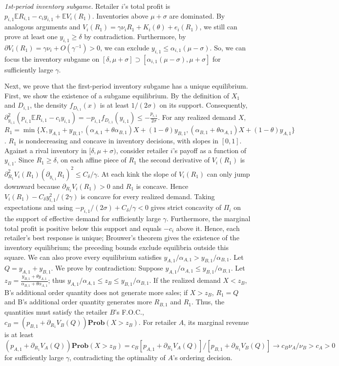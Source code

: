 \documentclass[nonblindrev,copyedit]{informs1}
\begin{document}
\begin{APPENDICES}
\textit{1st-period inventory subgame.}
Retailer $i$'s total profit is $p_{i,1}\mathbb{E} R_{i,1}-c_i y_{i,1}+\mathbb{E} V_i(R_1)$. Inventories above $\mu + \sigma$ are dominated. By analogous arguments and $V_i(R_{1})=\gamma\nu_i R_{1}+K_i(\theta)+e_i(R_{1})$, we still can prove at least one $y_{i,1} \geq \delta$ by contradiction. Furthermore, by $\partial V_i(R_{1}) = \gamma\nu_i + O(\gamma^{-1}) > 0$, we can exclude $y_{i,1}\leq\alpha_{i,1} (\mu - \sigma)$. So, we can focus the inventory subgame on $[\delta, \mu + \sigma] \supset [\alpha_{i,1}(\mu - \sigma), \mu + \sigma]$ for sufficiently large $\gamma$.

Next, we prove that the first-period inventory subgame has a unique equilibrium. First, we show the existence of a subgame equilibrium. By the definition of $X_1$ and $D_{i,1}$, the density $f_{D_{i,1}}(x)$ is at least $1/(2\sigma)$ on its support. Consequently, $\partial^2_{y_{i,1}}( p_{i,1}\mathbb{E} R_{i,1} - c_i y_{i,1} ) = -p_{i,1} f_{D_{i,1}}(y_{i,1}) \leq - \frac{p_{i,1}}{2 \sigma}$. For any realized demand $X$, $R_1=\min\{X,y_{A,1}+y_{B,1},(\alpha_{A,1}+\theta\alpha_{B,1})X+(1-\theta)y_{B,1}, (\alpha_{B,1}+\theta\alpha_{A,1})X+(1-\theta)y_{A,1}\}$. $R_1$ is nondecreasing and concave in inventory decisions, with slopes in $[0,1]$.
Against a rival inventory in $[\delta, \mu + \sigma)$, consider retailer $i$'s payoff as a function of $y_{i,1}$. Since $R_1\ge\delta$, on each affine piece of $R_1$ the second derivative of $V_i(R_1)$ is $\partial^2_{R_1}V_i(R_1)(\partial_{y_{i,1}}R_1)^2\le C_\delta/\gamma$. At each kink the slope of $V_i(R_1)$ can only jump downward because $\partial_{R_1}V_i(R_1)>0$ and $R_1$ is concave. Hence $V_i(R_1)-C_\delta y_{i,1}^2/(2\gamma)$ is concave for every realized demand. Taking expectations and using $-p_{i,1}/(2\sigma)+C_\delta/\gamma<0$ gives strict concavity of $\Pi_i$ on the support of effective demand for sufficiently large $\gamma$. Furthermore, the marginal total profit is positive below this support and equals $- c_i$ above it. Hence, each retailer's best response is unique; Brouwer's theorem gives the existence of the inventory equilibrium; the preceding bounds exclude equilibria outside this square. We can also prove every equilibrium satisfies $y_{A,1}/\alpha_{A,1} > y_{B,1}/\alpha_{B,1}$. Let $Q=y_{A,1}+y_{B,1}$. We prove by contradiction: Suppose $y_{A,1}/\alpha_{A,1}\leq y_{B,1}/\alpha_{B,1}$. Let $z_B = \frac{y_{B,1}+\theta y_{A,1}}{\alpha_{B,1} + \theta \alpha_{A,1}}$; thus $y_{A,1}/\alpha_{A,1}\leq z_B \leq y_{B,1}/\alpha_{B,1}$. If the realized demand $X < z_B$, B's additional order quantity does not generate more sales; if $X > z_B$, $R_1 = Q$ and B's additional order quantity generates more $R_{B,1}$ and $R_1$. Thus, the quantities must satisfy the retailer $B$'s F.O.C., $c_B = (p_{B,1} + \partial_{R_1} V_B(Q))\mathbf{Prob}(X > z_B)$. For retailer $A$, its marginal revenue is at least $(p_{A,1} + \partial_{R_1} V_A(Q))\mathbf{Prob}(X > z_B) = c_B[p_{A,1}+\partial_{R_1} V_A(Q)]/[p_{B,1}+\partial_{R_1} V_B(Q)]\to c_B\nu_A/\nu_B>c_A >0$ for sufficiently large $\gamma$, contradicting the optimality of $A$'s ordering decision.


\end{APPENDICES}
\end{document}
